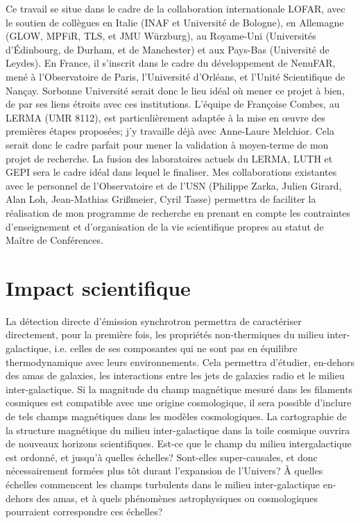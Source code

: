 \pg
Ce travail se situe dans le cadre de la collaboration internationale LOFAR, avec le soutien de coll\`egues en Italie (INAF et Universit\'e de Bologne), en Allemagne (GLOW, MPFiR, TLS, et JMU W\"urzburg), au Royame-Uni (Universit\'es d'\'Edinbourg, de Durham, et de Manchester) et aux Pays-Bas (Universit\'e de Leydes). En France, il s'inscrit dans le cadre du d\'eveloppement de NenuFAR, men\'e \`a l'Observatoire de Paris, l'Universit\'e d'Orl\'eans, et l'Unit\'e Scientifique de Nan\c{c}ay.  Sorbonne Universit\'e serait donc le lieu id\'eal o\`u mener ce projet \`a bien, de par ses liens \'etroits avec ces institutions. L'\'equipe de Fran\c{c}oise Combes, au LERMA (UMR 8112), est particuli\`erement adapt\'ee \`a la mise en {\oe}uvre des premi\`eres \'etapes propos\'ees; j'y travaille d\'ej\`a avec Anne-Laure Melchior. Cela serait donc le cadre parfait pour mener la validation \`a moyen-terme de mon projet de recherche. La fusion des laboratoires actuels du LERMA, LUTH et GEPI sera le cadre id\'eal dans lequel le finaliser. Mes collaborations existantes avec le personnel de l'Observatoire et de l'USN (Philippe Zarka, Julien Girard, Alan Loh, Jean-Mathias Gri{\ss}meier, Cyril Tasse) permettra de faciliter la r\'ealisation de mon programme de recherche en prenant en compte les contraintes d'enseignement et d'organisation de la vie scientifique propres au statut de Ma\^itre de Conf\'erences.


\section{Impact scientifique}

\pg
La d\'etection directe d'\'emission synchrotron permettra de caract\'eriser directement, pour la premi\`ere fois, les propri\'et\'es non-thermiques du milieu inter-galactique, i.e. celles de ses composantes qui ne sont pas en \'equilibre thermodynamique avec leurs environnements. Cela permettra d'\'etudier, en-dehors des amas de galaxies, les interactions entre les jets de galaxies radio et le milieu inter-galactique. 
Si la magnitude du champ magn\'etique mesur\'e dans les filaments cosmiques est compatible avec une origine cosmologique, il sera possible d'inclure de tels champs magn\'etiques dans les mod\`eles cosmologiques. 
La cartographie de la structure magn\'etique du milieu inter-galactique dans la toile cosmique ouvrira de nouveaux horizons scientifiques. Est-ce que le champ du milieu intergalactique est ordonn\'e, et jusqu'\`a quelles \'echelles? Sont-elles super-causales, et donc n\'ecessairement form\'ees plus t\^ot durant l'expansion de l'Univers? \`A quelles \'echelles commencent les champs turbulents dans le milieu inter-galactique en-dehors des amas, et \`a quels ph\'enom\`enes astrophysiques ou cosmologiques pourraient correspondre ces \'echelles?

